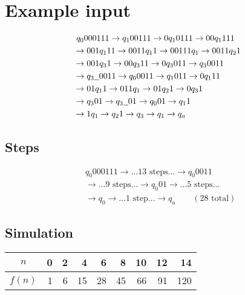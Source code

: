 \documentclass{iansnotes}
\begin{document}
  \section*{Example input}
  
  \begin{align*}
    &\           q_0 000111    \rightarrow  q_1 00111  \rightarrow 0 q_1 0111 \rightarrow 00 q_1 111 \\
    &\rightarrow 001 q_1 11    \rightarrow 0011 q_1 1  \rightarrow 00111 q_1  \rightarrow 0011 q_2 1 \\
    &\rightarrow 001 q_3 1     \rightarrow 00 q_3 11   \rightarrow 0 q_3 011  \rightarrow q_3 0011   \\
    &\rightarrow q_3 \underline{\hspace{2mm}} 0011 \rightarrow q_0 0011    \rightarrow q_1 011    \rightarrow 0 q_1 11   \\
    &\rightarrow 01 q_1 1      \rightarrow 011 q_1     \rightarrow 01 q_2 1   \rightarrow 0 q_3 1    \\
    &\rightarrow q_3 01        \rightarrow q_3 \underline{\hspace{2mm}} 01 \rightarrow q_0 01     \rightarrow q_1 1      \\
    &\rightarrow 1 q_1         \rightarrow q_2 1       \rightarrow q_3        \rightarrow q_1 \rightarrow q_a \\
  \end{align*}

  \subsection*{Steps}
  \begin{align*}
    &q_0 000111 \rightarrow \ldots 13 \textrm{ steps} \ldots \rightarrow q_0 0011 \\
    &\rightarrow \ldots 9 \textrm{ steps} \ldots \rightarrow q_0 01 \rightarrow \ldots 5 \textrm{ steps} \ldots\\
    & \rightarrow q_0 \rightarrow \ldots 1 \textrm{ step} \ldots \rightarrow q_a \qquad (28 \textrm{ total})
  \end{align*}
  
  
    \subsection*{Simulation}
    
    \begin{center}
    \begin{tabular}{crrrrrrrr}
      \toprule
      $n$   & 0 &  2 &  4 &  6 &  8 & 10 & 12 &  14 \\
      \midrule
      $f(n)$ & 1 &  6 & 15 & 28 & 45 & 66 & 91 & 120 \\
      \bottomrule
    \end{tabular}
    \end{center}
    
\end{document}
